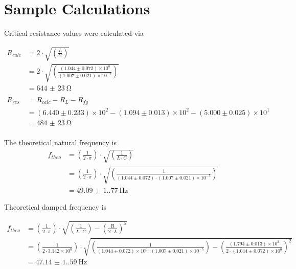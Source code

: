 \section{Sample Calculations}

Critical resistance values were calculated via

$$
\begin{aligned}
R_{calc} &= 2 \cdot \sqrt{ \left( \frac{ L }{ C } \right)} \\&= 2 \cdot \sqrt{ \left( \frac{ \left(1.044 \pm 0.072\right) \times 10^{0} }{ \left(1.007 \pm 0.021\right) \times 10^{-5} } \right)} \\&= \qty{644(23)}{\ohm} \\
\\
R_{res} &= R_{calc} - R_{L} - R_{fg} \\&= \left(6.440 \pm 0.233\right) \times 10^{2} - \left(1.094 \pm 0.013\right) \times 10^{2} - \left(5.000 \pm 0.025\right) \times 10^{1} \\&= \qty{484(23)}{\ohm}  \\
\end{aligned}
$$

The theoretical natural frequency is
$$
\begin{aligned}
    f_{theo} &= \left( \frac{ 1 }{ 2 \cdot \pi } \right) \cdot \sqrt{\left(\frac{ 1 }{ L \cdot C } \right)} \\
    &= \left( \frac{ 1 }{ 2 \cdot \pi } \right) \cdot \sqrt {\left(
                                                                 \frac{ 1 }{ \left(1.044 \pm 0.072\right)
                                                                 \cdot \left(1.007 \pm 0.021\right) \times 10^{-5} }
    \right)} \\
    &= \qty{49.09(1.77)}{\hertz}
\end{aligned}
$$

Theoretical damped frequency is

$$
\begin{aligned}
f_{theo} &= \left( \frac{ 1 }{ 2 \cdot \pi } \right) \cdot \sqrt { \left( \frac{ 1 }{ L \cdot C } \right) - \left( \frac{ \mathrm{R} }{ 2 \cdot L } \right) ^{ 2 } } \\&= \left( \frac{ 1 }{ 2 \cdot 3.142 \times 10 ^ {0} } \right) \cdot \sqrt { \left( \frac{ 1 }{ \left(1.044 \pm 0.072\right) \times 10^{0} \cdot \left(1.007 \pm 0.021\right) \times 10^{-5} } \right) - \left( \frac{ \left(1.794 \pm 0.013\right) \times 10^{2} }{ 2 \cdot \left(1.044 \pm 0.072\right) \times 10^{0} } \right) ^{ 2 } } \\
&= \qty{47.14(1.59)}{\hertz}\\
\end{aligned}
$$

